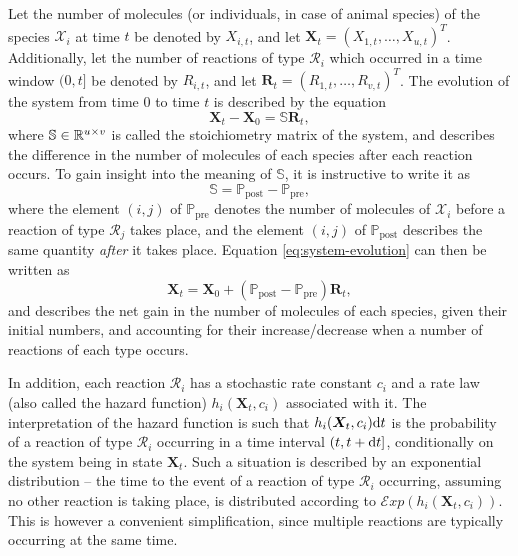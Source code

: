 Let the number of molecules (or individuals, in case of animal species) of the species $\mathcal{X}_i$ at time $t$ be denoted by $X_{i,t}$, and let $\bm{X}_t = \left(X_{1,t}, \ldots, X_{u,t}\right)^T$. Additionally, let the number of reactions of type $\mathcal{R}_i$ which occurred in a time window $(0, t]$ be denoted by $R_{i,t}$, and let $\bm{R}_t = \left(R_{1,t}, \ldots,R_{v,t}\right)^T$. The evolution of the system from time 0 to time $t$ is described by the equation
\begin{equation} \label{eq:system-evolution}
\bm{X}_t - \bm{X}_0 = \mathbb{S}\bm{R}_t,
\end{equation}
where $\mathbb{S} \in \mathbb{R}^{u \times v}$ is called the stoichiometry matrix of the system, and describes the difference in the number of molecules of each species after each reaction occurs. To gain insight into the meaning of $\mathbb{S}$, it is instructive to write it as
\begin{equation*}
\mathbb{S} = \mathbb{P}_\text{post} - \mathbb{P}_\text{pre},
\end{equation*}
where the element $(i,j)$ of $\mathbb{P}_\text{pre}$ denotes the number of molecules of $\mathcal{X}_i$ before a reaction of type $\mathcal{R}_j$ takes place, and the element $(i,j)$ of $\mathbb{P}_\text{post}$ describes the same quantity \emph{after} it takes place. Equation \eqref{eq:system-evolution} can then be written as
\begin{equation*}
\bm{X}_t = \bm{X}_0 + \left(\mathbb{P}_\text{post} - \mathbb{P}_\text{pre}\right) \bm{R}_t,
\end{equation*}
and describes the net gain in the number of molecules of each species, given their initial numbers, and accounting for their increase/decrease when a number of reactions of each type occurs.

In addition, each reaction $\mathcal{R}_i$ has a stochastic rate constant $c_i$ and a rate law (also called the hazard function) $h_i(\bm{X}_t, c_i)$ associated with it. The interpretation of the hazard function is such that $h_i(\bm{X}_t, c_i) \mathrm{d}{t}$ is the probability of a reaction of type $\mathcal{R}_i$ occurring in a time interval $(t, t + \mathrm{d}{t}]$, conditionally on the system being in state $\bm{X}_t$. Such a situation is described by an exponential distribution -- the time to the event of a reaction of type $\mathcal{R}_i$ occurring, assuming no other reaction is taking place, is distributed according to ${\mathcal{E}\mathit{xp}(h_i(\bm{X}_t, c_i))}$. This is however a convenient simplification, since multiple reactions are typically occurring at the same time.

